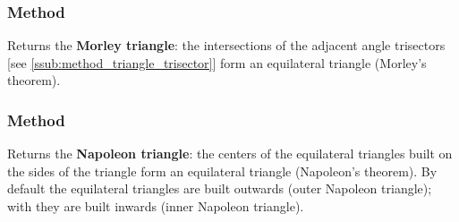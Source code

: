 \subsubsection{Method }
\label{ssub:method_triangle_morley}

Returns the \textbf{Morley triangle}: the intersections of the adjacent angle
trisectors [see \ref{ssub:method_triangle_trisector}] form an equilateral
triangle (Morley's theorem).

\begin{tkzexample}[latex=.5\textwidth]
\begin{center}
\end{center}
\end{tkzexample}

\subsubsection{Method }
\label{ssub:method_triangle_napoleon}

Returns the \textbf{Napoleon triangle}: the centers of the equilateral triangles
built on the sides of the triangle form an equilateral triangle (Napoleon's
theorem). By default the equilateral triangles are built outwards (outer
Napoleon triangle); with  they are built inwards (inner Napoleon
triangle).

\begin{tkzexample}[latex=.5\textwidth]
\begin{center}
\end{center}
\end{tkzexample}

